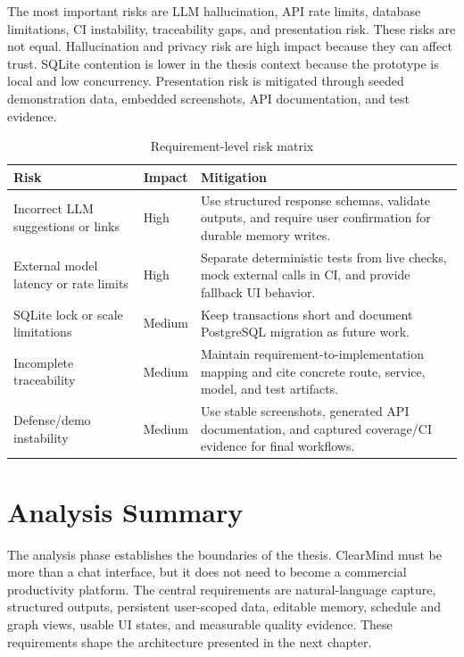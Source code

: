 The most important risks are LLM hallucination, API rate limits, database limitations, CI instability, traceability gaps, and presentation risk. These risks are not equal. Hallucination and privacy risk are high impact because they can affect trust. SQLite contention is lower in the thesis context because the prototype is local and low concurrency. Presentation risk is mitigated through seeded demonstration data, embedded screenshots, API documentation, and test evidence.

\begin{longtable}{|p{}|p{}|p{}|}
\caption{Requirement-level risk matrix}
\label{tab:risk}\\
\hline
\textbf{Risk} & \textbf{Impact} & \textbf{Mitigation}\\
\hline
Incorrect LLM suggestions or links & High & Use structured response schemas, validate outputs, and require user confirmation for durable memory writes.\\
\hline
External model latency or rate limits & High & Separate deterministic tests from live checks, mock external calls in CI, and provide fallback UI behavior.\\
\hline
SQLite lock or scale limitations & Medium & Keep transactions short and document PostgreSQL migration as future work.\\
\hline
Incomplete traceability & Medium & Maintain requirement-to-implementation mapping and cite concrete route, service, model, and test artifacts.\\
\hline
Defense/demo instability & Medium & Use stable screenshots, generated API documentation, and captured coverage/CI evidence for final workflows.\\
\hline
\end{longtable}

\section{Analysis Summary}

The analysis phase establishes the boundaries of the thesis. ClearMind must be more than a chat interface, but it does not need to become a commercial productivity platform. The central requirements are natural-language capture, structured outputs, persistent user-scoped data, editable memory, schedule and graph views, usable UI states, and measurable quality evidence. These requirements shape the architecture presented in the next chapter.
